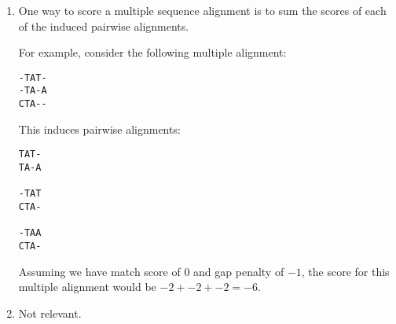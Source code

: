\begin{enumerate}[label=(\alph*)]
  \item
    One way to score a multiple sequence alignment is to sum the scores of each of the induced pairwise alignments.

    For example, consider the following multiple alignment:

\begin{verbatim}
-TAT-
-TA-A
CTA--
\end{verbatim}

This induces pairwise alignments:

\begin{verbatim}
TAT-
TA-A

-TAT
CTA-

-TAA
CTA-
\end{verbatim}

Assuming we have match score of $0$ and gap penalty of $-1$, the score for this multiple alignment would be $-2 + -2 + -2 = -6$.

\item
  Not relevant.




        
\end{enumerate}

